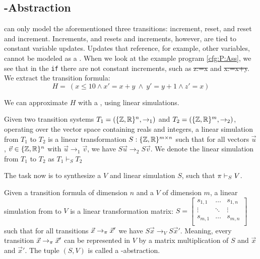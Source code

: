 \subsection{\qvasr-Abstraction}
\qvasr can only model the aforementioned three transitions: increment, reset, and reset and increment. Increments, and resets and increments, however, are tied to constant variable updates. Updates that reference, for example, other variables, cannot be modeled as a \qvasr. When we look at the example program \ref{cfg:P:Ass}, we see that in the \texttt{if} there are not constant increments, such as \st{z:=x} and \st{x:=x+y}. \\
We extract the transition formula:
\begin{equation*}
	H= \ (x \leq 10 \land x' = x + y\ \land\ y' = y + 1 \land z' = x)
\end{equation*}

We can approximate $H$ with a \qvasr, using linear simulations.

\begin{mydef}
	Given two transition systems $T_1 = ( \{ \mathbb{Z}, \mathbb{R} \} ^n, \rightarrow_1)$ and $T_2 = ( \{ \mathbb{Z}, \mathbb{R} \} ^m, \rightarrow_2)$, operating over the vector space containing reals and integers, a linear simulation from $T_1$ to $T_2$ is a linear transformation $S:  \{ \mathbb{Z}, \mathbb{R} \} ^{m \times n}$ such that for all vectors $\vec{u}$, $\vec{v} \in  \{ \mathbb{Z}, \mathbb{R} \} ^n$ with $\vec{u} \rightarrow_1 \vec{v}$, we have $S\vec{u} \rightarrow_2 S\vec{v}$. We denote the linear simulation from $T_1$ to $T_2$ as $T_1 \vdash_S T_2$
\end{mydef}
The task now is to synthesize a \qvasr $V$ and linear simulation $S$, such that $\pi \vdash_S V$.

\begin{mydef}
	 Given a transition formula \trf of dimension $n$ and a \qvasr $V$ of dimension $m$, a linear simulation from \trf to $V$ is a linear transformation matrix: 
	$S = 
	\begin{bmatrix}
		s_{1 ,1} & \ldots & s_{1, n} \\
		\vdots & \ddots & \vdots \\
		s_{m ,1} & \ldots & s_{m, n} \\
	\end{bmatrix}$ 
	such that for all transitions $\vec{x} \rightarrow_\pi \vec{x}'$ we have $S\vec{x} \rightarrow_V S\vec{x}'$. Meaning, every transition $\vec{x} \rightarrow_\pi \vec{x}'$ can be represented in $V$ by a matrix multiplication of $S$ and $\vec{x}$ and $\vec{x}'$. The tuple $(S, V)$ is called a \qvasr-abstraction.
\end{mydef}

